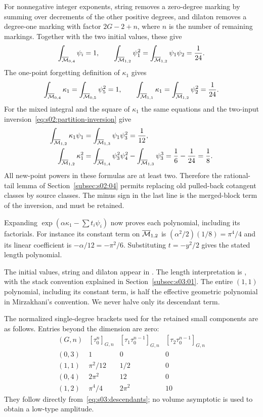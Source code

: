 \begin{prf}
For nonnegative integer exponents, string removes a zero-degree marking
by summing over decrements of the other positive degrees, and dilaton
removes a degree-one marking with factor $2G-2+n$, where $n$ is the
number of remaining markings. Together with the two initial values,
these give
\[
 \int_{\overline{\mathcal{M}}_{0,4}}\psi_i=1,\qquad
 \int_{\overline{\mathcal{M}}_{1,2}}\psi_1^2
 =\int_{\overline{\mathcal{M}}_{1,2}}\psi_1\psi_2=\frac1{24}.
\]
The one-point forgetting definition of $\kappa_1$ gives
\[
 \int_{\overline{\mathcal{M}}_{0,4}}\kappa_1
       =\int_{\overline{\mathcal{M}}_{0,5}}\psi_5^2=1,\qquad
 \int_{\overline{\mathcal{M}}_{1,1}}\kappa_1
       =\int_{\overline{\mathcal{M}}_{1,2}}\psi_2^2=\frac1{24}.
\]
For the mixed integral and the square of $\kappa_1$ the same equations
and the two-input inversion~\eqref{eq:s02:partition-inversion} give
\begin{align*}
 \int_{\overline{\mathcal{M}}_{1,2}}\kappa_1\psi_1
  &=\int_{\overline{\mathcal{M}}_{1,3}}\psi_1\psi_3^2=\frac1{12},\\
 \int_{\overline{\mathcal{M}}_{1,2}}\kappa_1^2
  &=\int_{\overline{\mathcal{M}}_{1,4}}\psi_3^2\psi_4^2
                -\int_{\overline{\mathcal{M}}_{1,3}}\psi_3^3
    =\frac16-\frac1{24}=\frac18.
\end{align*}
All new-point powers in these formulas are at least two. Therefore the
rational-tail lemma of Section~\ref{subsec:s02:04} permits replacing
old pulled-back cotangent classes by source classes. The minus sign
in the last line is the merged-block term of the inversion, and must
be retained.

Expanding $\exp(\alpha\kappa_1-\sum t_i\psi_i)$ now proves each
polynomial, including its factorials. For instance its constant term
on $\overline{\mathcal{M}}_{1,2}$ is $(\alpha^2/2)(1/8)=\pi^4/4$ and its linear
coefficient is $-\alpha/12=-\pi^2/6$.
Substituting $t=-y^2/2$ gives the stated length polynomial.
\end{prf}

\begin{rmk}[Conventions]
The initial values, string and dilaton appear in
\cite[Section~4.1 and (B.1)]{W26}. The length interpretation is
\cite[Theorem~4.4]{Mir07}, with the stack convention explained in
Section~\ref{subsec:s03:01}. The entire $(1,1)$ polynomial, including
its constant term, is half the effective geometric polynomial in
Mirzakhani's convention. We never halve only its descendant term.
\end{rmk}

The normalized single-degree brackets used for the retained small
components are as follows.
Entries beyond the dimension are zero:
\begin{equation}\label{eq:a:small-amplitudes}
\begin{array}{c|ccc}
 (G,n)&[\tau_0^n]_{G,n}&[\tau_1\tau_0^{n-1}]_{G,n}
                                      &[\tau_2\tau_0^{n-1}]_{G,n}\\\hline
 (0,3)&1&0&0\\
 (1,1)&\pi^2/12&1/2&0\\
 (0,4)&2\pi^2&12&0\\
 (1,2)&\pi^4/4&2\pi^2&10
\end{array}
\end{equation}
They follow directly from~\eqref{eq:s03:descendants}; no volume
asymptotic is used to obtain a low-type amplitude.
